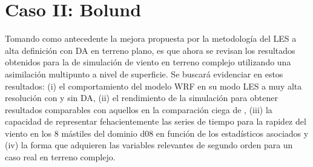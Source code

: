 \newpage
\section{Caso II: Bolund}
Tomando como antecedente la mejora propuesta por la metodología del LES a alta definición con DA en terreno plano, es que ahora se revisan los resultados obtenidos para la de simulación de viento en terreno complejo utilizando una asimilación multipunto a nivel de superficie. Se buscará evidenciar en estos resultados: (i) el comportamiento del modelo WRF en su modo LES a muy alta resolución con y sin DA, (ii) el rendimiento de la simulación para obtener resultados comparables con aquellos en la comparación ciega de \cite{Bechmann2011}, (iii) la capacidad de representar fehacientemente las series de tiempo para la rapidez del viento en los 8 mástiles del dominio d08 en función de los estadísticos asociados y (iv) la forma que adquieren las variables relevantes de segundo orden para un caso real en terreno complejo.

